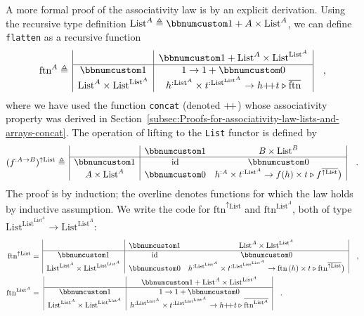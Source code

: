 A more formal proof of the associativity law is by an explicit derivation.
Using the recursive type definition $\text{List}^{A}\triangleq\bbnum 1+A\times\text{List}^{A}$,
we can define \lstinline!flatten! as a recursive function
\[
\text{ftn}^{A}\triangleq\,\begin{array}{|c|c|}
 & \bbnum 1+\text{List}^{A}\times\text{List}^{\text{List}^{A}}\\
\hline \bbnum 1 & 1\rightarrow1+\bbnum 0\\
\text{List}^{A}\times\text{List}^{\text{List}^{A}} & h^{:\text{List}^{A}}\times t^{:\text{List}^{\text{List}^{A}}}\rightarrow h\pplus t\triangleright\overline{\text{ftn}}
\end{array}\quad,
\]
where we have used the function \lstinline!concat! (denoted ${\displaystyle }{+\negmedspace+}$)
whose associativity property was derived in Section~\ref{subsec:Proofs-for-associativity-law-lists-and-arrays-concat}.
The operation of lifting to the \lstinline!List! functor is defined
by
\[
(f^{:A\rightarrow B})^{\uparrow\text{List}}\triangleq\,\begin{array}{|c|cc|}
 & \bbnum 1 & B\times\text{List}^{B}\\
\hline \bbnum 1 & \text{id} & \bbnum 0\\
A\times\text{List}^{A} & \bbnum 0 & h^{:A}\times t^{:\text{List}^{A}}\rightarrow f(h)\times t\triangleright f^{\overline{\uparrow\text{List}}}\big)
\end{array}\quad.
\]
The proof is by induction; the overline denotes functions for which
the law holds by inductive assumption. We write the code for $\text{ftn}^{\uparrow\text{List}}$
and $\text{ftn}^{\text{List}^{A}}$, both of type $\text{List}^{\text{List}^{\text{List}^{A}}}\rightarrow\text{List}^{\text{List}^{A}}$:
\begin{align*}
\text{ftn}^{\uparrow\text{List}} & =\,\begin{array}{|c|cc|}
 & \bbnum 1 & \text{List}^{A}\times\text{List}^{\text{List}^{A}}\\
\hline \bbnum 1 & \text{id} & \bbnum 0\\
\text{List}^{\text{List}^{A}}\times\text{List}^{\text{List}^{\text{List}^{A}}} & \bbnum 0 & h^{:\text{List}^{\text{List}^{A}}}\times t^{:\text{List}^{\text{List}^{\text{List}^{A}}}}\rightarrow\text{ftn}\,(h)\times t\triangleright\text{ftn}^{\overline{\uparrow\text{List}}}\big)
\end{array}\quad,\\
\text{ftn}^{\text{List}^{A}} & =\,\,\begin{array}{|c|c|}
 & \bbnum 1+\text{List}^{A}\times\text{List}^{\text{List}^{A}}\\
\hline \bbnum 1 & 1\rightarrow1+\bbnum 0\\
\text{List}^{\text{List}^{A}}\times\text{List}^{\text{List}^{\text{List}^{A}}} & h^{:\text{List}^{\text{List}^{A}}}\times t^{:\text{List}^{\text{List}^{\text{List}^{A}}}}\rightarrow h\pplus t\triangleright\overline{\text{ftn}^{\text{List}^{A}}}
\end{array}\quad.
\end{align*}
